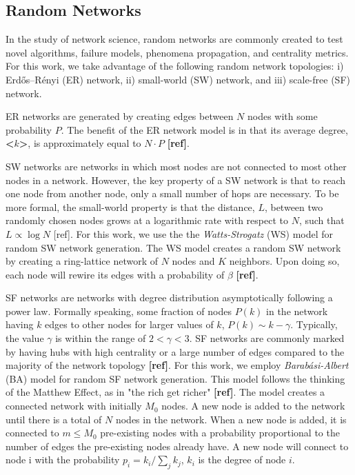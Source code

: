 \documentclass[letterpaper, 10 pt, conference]{ieeeconf}  %
\begin{document}
\subsection{Random Networks}
In the study of network science, random networks are commonly created to test novel algorithms, failure models, phenomena propagation, and centrality metrics. For this work, we take advantage of the following random network topologies: i) Erdős–Rényi (ER) network, ii) small-world (SW) network, and iii) scale-free (SF) network.

ER networks are generated by creating edges between $N$ nodes with some probability $P$. The benefit of the ER network model is in that its average degree, \textbf{\textless $k$\textgreater}, is approximately equal to $N \cdot P$ \textbf{[ref]}.

SW networks are networks in which most nodes are not connected to most other nodes in a network. However, the key property of a SW network is that to reach one node from another node, only a small number of hops are necessary. To be more formal, the small-world property is that the distance, $L$, between two randomly chosen nodes grows at a logarithmic rate with respect to $N$, such that $L \propto \log{N}$ [ref]. For this work, we use the the \textit{Watts-Strogatz} (WS) model for random SW network generation. The WS model creates a random SW network by creating a ring-lattice network of $N$ nodes and $K$ neighbors. Upon doing so, each node will rewire its edges with a probability of $\beta$ \textbf{[ref]}.

SF networks are networks with degree distribution asymptotically following a power law. Formally speaking, some fraction of nodes $P(k)$ in the network having $k$ edges to other nodes for larger values of $k$, $P(k) \sim k-\gamma$. Typically, the value $\gamma$ is within the range of $2 < \gamma < 3$. SF networks are commonly marked by having hubs with high centrality or a large number of edges compared to the majority of the network topology \textbf{[ref]}. For this work, we employ \textit{Barab\'{a}si-Albert} (BA) model for random SF network generation. This model follows the thinking of the Matthew Effect, as in "the rich get richer" \textbf{[ref]}. The model creates a connected network with initially $M_{0}$ nodes. A new node is added to the network until there is a total of $N$ nodes in the network. When a new node is added, it is connected to $m \le M_{0}$ pre-existing nodes with a probability proportional to the number of edges the pre-existing nodes already have. A new node will connect to node i with the probability $p_{i}=k_{i}/\sum_{j}{k_{j}}$, $k_{i}$ is the degree of node $i$.
\end{document}
